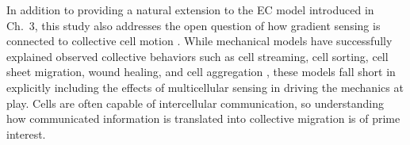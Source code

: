

In addition to providing a natural extension to the EC model introduced in Ch.\ 3, this study also addresses the open question of how gradient sensing is connected to collective cell motion \cite{varennes2016sense,defranco2008migrating,haeger2015collective}.
While mechanical models have successfully explained observed collective behaviors such as cell streaming, cell sorting, cell sheet migration, wound healing, and cell aggregation \cite{kabla2012collective,szabo2010collective,basan2013alignment,janulevicius2015short},
these models fall short in explicitly including the effects of multicellular sensing in driving the mechanics at play. Cells are often capable of intercellular communication, so understanding how communicated information is translated into collective migration is of prime interest.

